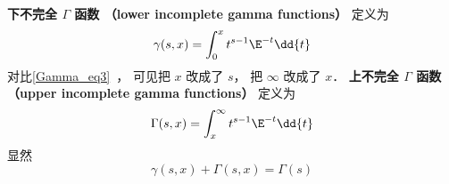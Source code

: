 
\begin{issues}
\issueDraft
\end{issues}


\textbf{下不完全 $\Gamma$ 函数 （lower incomplete gamma functions）} 定义为
\begin{equation}
\gamma(s, x) = \int_0^x t^{s-1}\E^{-t} \dd{t}
\end{equation}
对比\autoref{Gamma_eq3}~， 可见把 $x$ 改成了 $s$， 把 $\infty$ 改成了 $x$．
\textbf{上不完全 $\Gamma$ 函数 （upper incomplete gamma functions）} 定义为
\begin{equation}
\Gamma(s, x) = \int_x^\infty t^{s-1}\E^{-t} \dd{t}
\end{equation}
显然
\begin{equation}
\gamma(s, x) + \Gamma(s, x) = \Gamma(s)
\end{equation}
